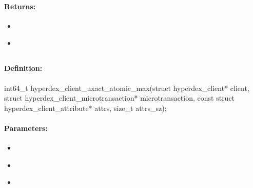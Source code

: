 \paragraph{Returns:}
\begin{itemize}[noitemsep]
\item {}\\

\item {}\\

\end{itemize}

\pagebreak
\subsection{}
\label{api:c:uxact_atomic_max}


\paragraph{Definition:}
\begin{ccode}
int64_t hyperdex_client_uxact_atomic_max(struct hyperdex_client* client,
        struct hyperdex_client_microtransaction* microtransaction,
        const struct hyperdex_client_attribute* attrs, size_t attrs_sz);
\end{ccode}

\paragraph{Parameters:}
\begin{itemize}[noitemsep]
\item {}\\

\item {}\\

\item {}\\

\end{itemize}

